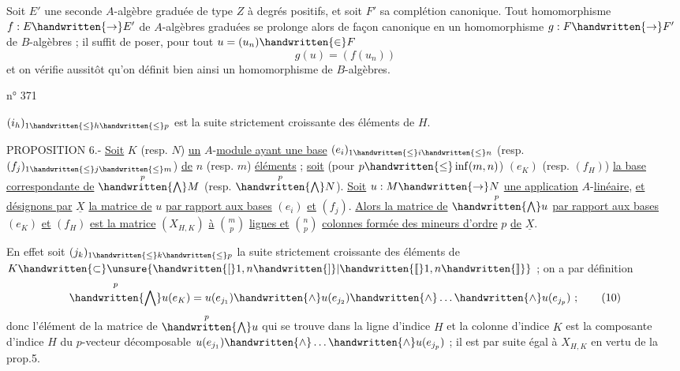 Soit $E'$ une seconde $A$-algèbre graduée de type $Z$ à degrés positifs, et soit $F'$ sa complétion canonique. Tout homomorphisme $f:E\handwritten{\to}E'$ de $A$-algèbres graduées se prolonge alors de façon canonique en un homomorphisme $g:F\handwritten{\to}F'$ de $B$-algèbres ; il suffit de poser, pour tout $u=(u_n)\handwritten{\in}F$
\[
g(u)=(f(u_n))
\]
et on vérifie aussitôt qu'on définit bien ainsi un homomorphisme de $B$-algèbres.

\begin{flushright}n° 371\end{flushright}

$(i_h)_{1\handwritten{\leq}h\handwritten{\leq}p}$ est la suite strictement croissante des éléments de $H$.

PROPOSITION 6.- \uline{Soit} $K$ (resp. $N$) \uline{un} $A$-\uline{module ayant une base} $(e_i)_{1\handwritten{\leq}i\handwritten{\leq}n}$ (resp. $(f_j)_{1\handwritten{\leq}j\handwritten{\leq}m}$) \uline{de} $n$ (resp. $m$) \uline{éléments} ; \uline{soit} (pour $p\handwritten{\leq}\inf(m,n)$) $(e_K)$ (resp. $(f_H)$) \uline{la base correspondante de} $\overset{p}{\handwritten{\bigwedge}}M$ (resp. $\overset{p}{\handwritten{\bigwedge}}N$). \uline{Soit} $u:M\handwritten{\to}N$ \uline{une application} $A$-\uline{linéaire}, \uline{et désignons par} $\underline{X}$ \uline{la matrice de} $u$ \uline{par rapport aux bases} $(e_i)$ \uline{et} $(f_j)$. \uline{Alors la matrice de} $\overset{p}{\handwritten{\bigwedge}}u$ \uline{par rapport aux bases} $(e_K)$ \uline{et} $(f_H)$ \uline{est la matrice} $(X_{H,K})$ \uline{à} $\binom{m}{p}$ \uline{lignes et} $\binom{n}{p}$ \uline{colonnes formée des mineurs d'ordre} $p$ \uline{de} $\underline{X}$.

En effet soit $(j_k)_{1\handwritten{\leq}k\handwritten{\leq}p}$ la suite strictement croissante des éléments de $K\handwritten{\subset}\unsure{\handwritten{[}1,n\handwritten{]}|\handwritten{[\![}1,n\handwritten{]\!]}}$ ; on a par définition
\[
\overset{p}{\handwritten{\bigwedge}}u(e_K)=u(e_{j_1})\handwritten{\wedge}u(e_{j_2})\handwritten{\wedge}\ldots\handwritten{\wedge}u(e_{j_p})\ ;
\tag*{(10)}
\]
donc l'élément de la matrice de $\overset{p}{\handwritten{\bigwedge}}u$ qui se trouve dans la ligne d'indice $H$ et la colonne d'indice $K$ est la composante d'indice $H$ du $p$-vecteur décomposable $u(e_{j_1})\handwritten{\wedge}\ldots\handwritten{\wedge}u(e_{j_p})$ ; il est par suite égal à $X_{H,K}$ en vertu de la prop.5.

